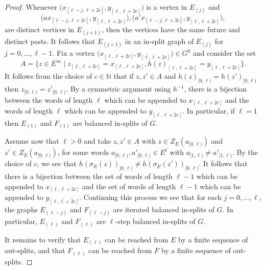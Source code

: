 \documentclass[12pt,a4paper,oneside,reqno,final]{amsart}
\newcommand{\N}{\mathbb{N}}
\theoremstyle{definition}
\numberwithin{equation}{section} %
\begin{document}
\begin{proof}
    Whenever $\big( x_{[\ell - j, \ell + 2c]}, y_{[\ell, \ell + 2c]} \big)$ is a vertex in $E_{(j)}$ and
    \[
        \big( a x_{[\ell - j, \ell + 2c]}, y_{[\ell, \ell + 2c]}\big), 
        \big( a' x_{[\ell - j, \ell + 2c]}, y_{[\ell, \ell + 2c]}\big),
    \]
    are distinct vertices in $E_{(j + 1)}$, then the vertices have the same future and distinct pasts.
    It follows that $E_{(j + 1)}$ in an in-split graph of $E_{(j)}$ for $j = 0, \ldots, \ell - 1$.
    Fix a vertex $\big(x_{[\ell, \ell + 2c]}, y_{[\ell, \ell + 2c]}\big)\in G^0$ and consider the set
    \[
        A = \{ z\in E^\infty \mid z_{[\ell, \ell + 2c]} = x_{[\ell, \ell + 2c]}, h(z)_{[\ell, \ell + 2c]} = y_{[\ell, \ell + 2c]}\}.
    \]
    It follows from the choice of $c\in \N$ that if $z, z'\in A$ and $h(z)_{[0, \ell)} = h(z')_{[0, \ell)}$ then $z_{[0, \ell)} = z'_{[0, \ell)}$.
    By a symmetric argument using $h^{-1}$, there is a bijection between the words of length $\ell$ which can be appended to $x_{[\ell, \ell + 2c]}$ 
    and the words of length $\ell$ which can be appended to $y_{[\ell, \ell + 2c]}$.
    In particular, if $\ell = 1$ then $E_{(1)}$ and $F_{(1)}$ are balanced in-splits of $G$.

    Assume now that $\ell > 0$ and take $z, z'\in A$ with $z\in Z_E(a_{[0, \ell)})$ and $z'\in Z_E(a_{[0,\ell)})$,
    for some words $a_{[0,\ell)}, a'_{[0,\ell)}\in E^\ell$ with $a_{[1,\ell)} \neq a'_{[1,\ell)}$.
    By the choice of $c$, we see that $h(\sigma_E(z))_{[0, \ell)} \neq h(\sigma_E(z'))_{[0, \ell)}$.
    It follows that there is a bijection between the set of words of length $\ell - 1$ which can be appended to $x_{[\ell, \ell + 2c]}$
    and the set of words of length $\ell - 1$ which can be appended to $y_{[\ell, \ell + 2c]}$.
    Continuing this process we see that for each $j = 0,\ldots, \ell$, the graphs $E_{(\ell - j)}$ and $F_{(\ell - j)}$ are iterated balanced in-splits of $G$.
    In particular, $E_{(\ell)}$ and $F_{(\ell)}$ are $\ell$-step balanced in-splits of $G$.

    It remains to verify that $E_{(\ell)}$ can be reached from $E$ by a finite sequence of out-splits,
    and that $F_{(\ell)}$ can be reached from $F$ by a finite sequence of out-splits.


\end{proof}
\end{document}
